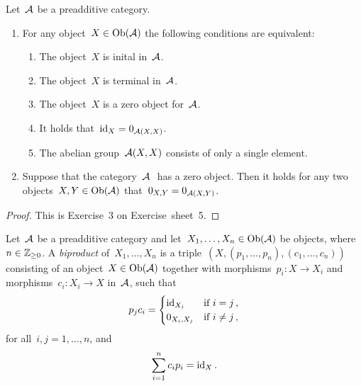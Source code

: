 \begin{lemma}
  \label{inital terminal zero}
  Let~$\mathcal{A}$ be a preadditive category.
  \begin{enumerate}
    \item
      For any object~$X \in \operatorname{Ob}(\mathcal{A})$ the following conditions are equivalent:
      \begin{enumerate}
        \item
          The object~$X$ is inital in~$\mathcal{A}$.
        \item
          The object~$X$ is terminal in~$\mathcal{A}$.
        \item
          The object~$X$ is a zero object for~$\mathcal{A}$.
        \item
          It holds that~$\operatorname{id}_X = 0_{\mathcal{A}(X,X)}$.
        \item
          The abelian group~$\mathcal{A}(X,X)$ consists of only a single element.
      \end{enumerate}
    \item
      Suppose that the category~$\mathcal{A}~$ has a zero object.
      Then it holds for any two objects~$X, Y \in \operatorname{Ob}(\mathcal{A})$ that~$0_{X,Y} = 0_{\mathcal{A}(X,Y)}$.
  \end{enumerate}
\end{lemma}


\begin{proof}
  This is Exercise~3 on Exercise~sheet~5.
\end{proof}







\begin{definition}
  Let~$\mathcal{A}$ be a preadditive category and let~$X_1, \dotsc, X_n \in \operatorname{Ob}(\mathcal{A})$ be objects, where~$n \in \mathbb{Z}_{\geq 0}$.
  A \emph{biproduct} of~$X_1, \dotsc, X_n$ is a triple~$(X, (p_1, \dotsc, p_n), (c_1, \dotsc, c_n))$ consisting of an object~$X \in \operatorname{Ob}(\mathcal{A})$ together with morphisms~$p_i \colon X \to X_i$ and morphisms~$c_i \colon X_i \to X$ in~$\mathcal{A}$, such that
  \begin{equation}
    \label{no abuse of notation}
      p_j c_i
    = \begin{cases}
        \operatorname{id}_{X_i}     & \text{if~$i = j$}     \,, \\
        0_{X_i, X_j}  & \text{if~$i \neq j$}  \,,
      \end{cases}
  \end{equation}
  for all~$i,j = 1, \dots, n$, and
  \[
      \sum_{i=1}^n c_i p_i
    = {\operatorname{id}_X} \,.
  \]
\end{definition}


